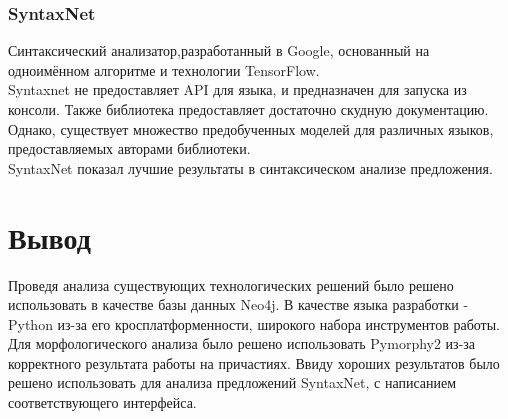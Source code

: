  \subsubsection{SyntaxNet}
 Синтаксический анализатор,разработанный в Google,  основанный на одноимённом алгоритме и технологии TensorFlow.\\
 Syntaxnet не предоставляет API для языка, и предназначен для запуска из консоли. Также библиотека 
 предоставляет достаточно скудную документацию. Однако, существует множество предобученных моделей для различных языков, предоставляемых авторами библиотеки.\\
 SyntaxNet показал лучшие результаты в синтаксическом анализе предложения.
 \section{Вывод}
 Проведя анализа существующих технологических решений было решено использовать в качестве базы данных Neo4j. В качестве языка разработки - Python из-за его кросплатформенности, широкого набора инструментов работы.  Для морфологического анализа было решено использовать Pymorphy2 из-за корректного результата работы на причастиях. Ввиду хороших результатов было решено использовать для анализа предложений SyntaxNet, с написанием соответствующего интерфейса. 

